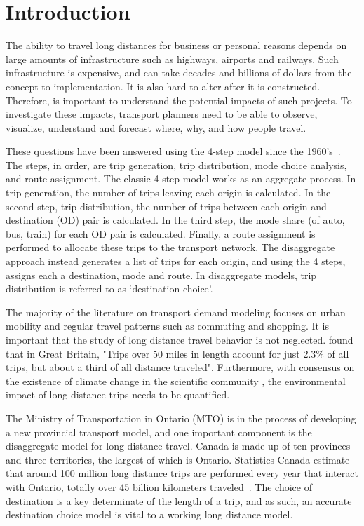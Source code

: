 \chapter{Introduction}
The ability to travel long distances for business or personal reasons depends on large amounts of infrastructure such as highways, airports and railways. Such infrastructure is expensive, and can take decades and billions of dollars from the concept to implementation. It is also hard to alter after it is constructed. Therefore, is important to understand the potential impacts of such projects. To investigate these impacts, transport planners need to be able to observe, visualize, understand and forecast where, why, and how people travel. 

These questions have been answered using the 4-step model since the 1960's~\parencite{de1994modelling}.  The steps, in order, are trip generation, trip distribution, mode choice analysis, and route assignment. The classic 4 step model works as an aggregate process. In trip generation, the number of trips leaving each origin is calculated. In the second step, trip distribution, the number of trips between each origin and destination (OD) pair is calculated. In the third step, the mode share (of auto, bus, train) for each OD pair is calculated. Finally, a route assignment is performed to allocate these trips to the transport network. The disaggregate approach instead generates a list of trips for each origin, and using the 4 steps, assigns each a destination, mode and route. In disaggregate models, trip distribution is referred to as `destination choice'.

The majority of the literature on transport demand modeling focuses on urban mobility and regular travel patterns such as commuting and shopping. It is important that the study of long distance travel behavior is not neglected. \textcite{rohr2010modelling} found that in Great Britain, "Trips over 50 miles in length account for just 2.3\% of all trips, but about a third of all distance traveled". Furthermore, with  consensus on the existence of climate change in the scientific community \parencite{oreskes2004scientific}, the environmental impact of long distance trips needs to be quantified.

The Ministry of Transportation in Ontario (MTO) is in the process of developing a new provincial transport model, and one important component is the disaggregate model for long distance travel. Canada is made up of ten provinces and three territories, the largest of which is Ontario. Statistics Canada estimate that around 100 million long distance trips are performed every year that interact with Ontario, totally over 45 billion kilometers traveled~\parencite{tsrc}. The choice of destination is a key determinate of the length of a trip, and as such, an accurate destination choice model is vital to a working long distance model. 

